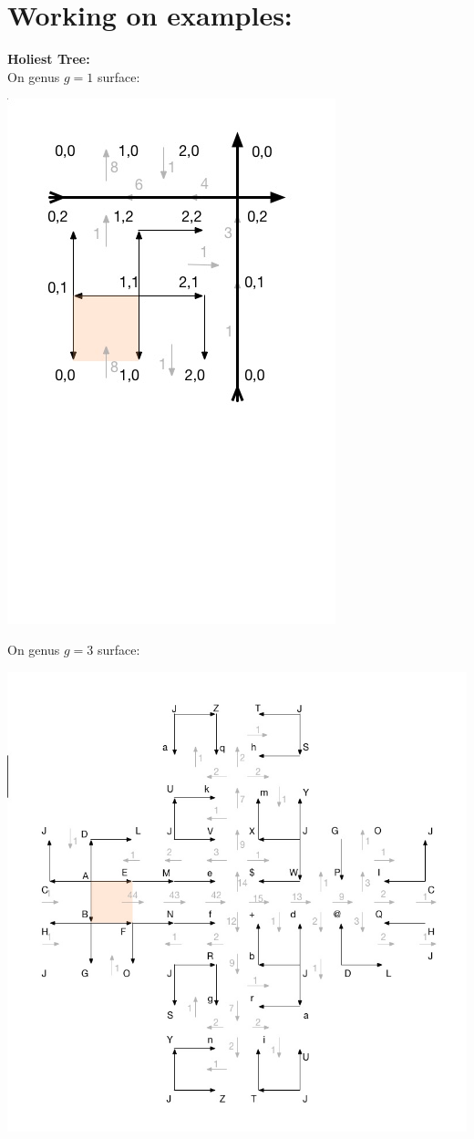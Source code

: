 \documentclass{article}
\begin{document}
\section{Working on examples:}
\textbf{Holiest Tree:} \\
On genus $g = 1$ surface:
\begin{center}
\includegraphics[scale = 0.6]{g1.jpg}
\end{center}

\newpage
On genus $g = 3$ surface:
\begin{center}
\includegraphics[scale = 0.6]{g3.jpg}
\end{center}
\end{document}
